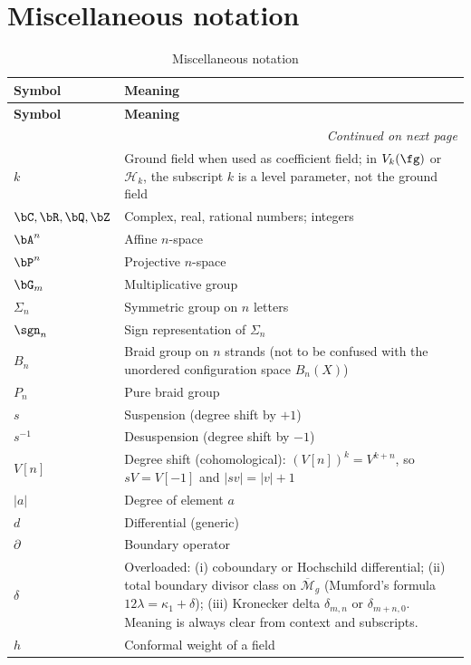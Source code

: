 \section{Miscellaneous notation}
\label{sec:notation-misc}

\begin{longtable}{p{3cm} p{10cm}}
\caption{Miscellaneous notation} \\
\toprule
\textbf{Symbol} & \textbf{Meaning} \\
\midrule
\endfirsthead
\toprule
\textbf{Symbol} & \textbf{Meaning} \\
\midrule
\endhead
\midrule
\multicolumn{2}{r}{\textit{Continued on next page}} \\
\endfoot
\bottomrule
\endlastfoot

$k$ & Ground field when used as coefficient field; in $V_k(\fg)$ or $\mathcal H_k$, the subscript $k$ is a level parameter, not the ground field \\
$\bC, \bR, \bQ, \bZ$ & Complex, real, rational numbers; integers \\
$\bA^n$ & Affine $n$-space \\
$\bP^n$ & Projective $n$-space \\
$\bG_m$ & Multiplicative group \\
$\Sigma_n$ & Symmetric group on $n$ letters \\
$\sgn_n$ & Sign representation of $\Sigma_n$ \\
$B_n$ & Braid group on $n$ strands (not to be confused with the unordered configuration space $B_n(X)$) \\
%
$P_n$ & Pure braid group \\
$s$ & Suspension (degree shift by $+1$) \\
$s^{-1}$ & Desuspension (degree shift by $-1$) \\
$V[n]$ & Degree shift (cohomological): $(V[n])^k = V^{k+n}$, so $sV = V[-1]$ and $|sv| = |v| + 1$ \\
$|a|$ & Degree of element $a$ \\
%
$d$ & Differential (generic) \\
$\partial$ & Boundary operator \\
$\delta$ & Overloaded: (i) coboundary or Hochschild differential; (ii) total boundary divisor class on $\overline{\mathcal{M}}_g$ (Mumford's formula $12\lambda = \kappa_1 + \delta$); (iii) Kronecker delta $\delta_{m,n}$ or $\delta_{m+n,0}$. Meaning is always clear from context and subscripts. \\
$h$ & Conformal weight of a field \\

\end{longtable}
